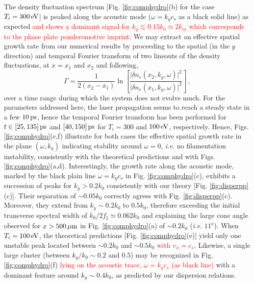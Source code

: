 \documentclass[
 reprint,
 superscriptaddress,
 amsmath,amssymb,
 aps,
]{revtex4-1}
\def\tc{\textcolor{red}}
\begin{document}
The   density fluctuation spectrum [Fig.  \ref{fig:comphydro}(b) for the case $T_i=300\,\rm eV$] is peaked along the acoustic mode ($\omega=k_yc_s$ as a black solid line) as expected \tc{and shows a dominant signal for $k_y\lesssim 0.15k_0 \simeq 2k_m$ which corresponds to the phase plate ponderomotive imprint.} We may extract an effective spatial growth rate from our numerical results by proceeding to the spatial (in the $y$ direction) and temporal Fourier transform of two lineouts of the density fluctuations, at $x=x_1$ and $x_2$ and following,
\begin{equation}
    \Gamma = \frac{1}{2(x_2-x_1)} \ln \left[\frac{\vert \delta n_e(x_2,k_y,\omega)\vert^2}{\vert \delta n_e(x_1,k_y,\omega)\vert^2}\right] \, , \label{eq:gammah}
\end{equation}
over a time range during which the system does not evolve much. 
For the parameters addressed here, the laser propagation seems to  reach a steady state in a few $10\,\rm ps$, hence the temporal Fourier transform has been performed for $t\in [25,135]\,\rm ps$ and  $[40,150]\,\rm ps$ for  $T_i=300$ and $100\, \rm eV$, respectively. 
Hence, Figs.  \ref{fig:comphydro}(c,f) illustrate for both cases  the effective spatial growth rate  in the plane $(\omega,k_y)$ indicating stability around $\omega=0$, \emph{i.e.} no filamentation instability, consistently with the theoretical predictions and with Figs. \ref{fig:comphydro}(a,d). 
Interestingly, the growth rate along the acoustic mode, marked by the black plain line $\omega=k_yc_s$ in Fig. \ref{fig:comphydro}(c), exhibits a succession of peaks for $k_y>0.2k_0$ consistently with our theory [Fig. \ref{fig:disperpp}(c)]. Their separation of $\sim 0.05 k_0$ correctly agrees with Fig. \ref{fig:disperpp}(c). Moreover, they extend from $k_y \sim  0.2k_0$  to $0.5k_0$, therefore exceeding the initial transverse spectral width of $k_0/2f_\sharp  \simeq 0.062k_0$ and  explaining the large cone angle   observed for $x>500\,\rm\mu m$ in Fig. \ref{fig:comphydro}(a) of $\sim 0.2k_0$ (\emph{i.e.} $11^o$).
When $T_i=100\, \rm eV$, the theoretical predictions [Fig. \ref{fig:comphydro}(e)] yield only one unstable peak located between $\sim 0.2k_0$ and $\sim 0.5k_0$ \tc{with $v_\phi=c_s$}. Likewise, a single large cluster (between  $k_y/k_0\sim 0.2$ and $0.5$) may be recognized  in Fig. \ref{fig:comphydro}(f) \tc{lying on the acoustic trace, $\omega = k_yc_s$ (as black line)} with a dominant feature around $k_y\sim 0.4k_0$, as predicted by our dispersion relations.
\end{document}
